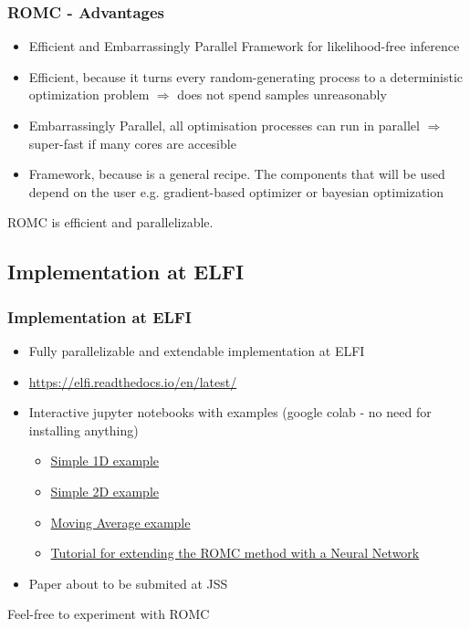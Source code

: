 \begin{frame}
  \frametitle{ROMC - Advantages}
  \begin{itemize}
  \item Efficient and Embarrassingly Parallel Framework for likelihood-free inference
  \item \alert{Efficient}, because it turns every random-generating
    process to a deterministic optimization problem \( \Rightarrow \)
    does not spend samples unreasonably
  \item \alert{Embarrassingly Parallel}, all optimisation processes
    can run in parallel \( \Rightarrow \) super-fast if many cores are accesible
  \item \alert{Framework}, because is a general recipe. The components
    that will be used depend on the user e.g. gradient-based optimizer
    or bayesian optimization
  \end{itemize}
  \noindent\makebox[\linewidth]{\rule{\paperwidth}{0.4pt}}
  ROMC is efficient and parallelizable.
\end{frame}

\subsection{Implementation at ELFI}
\begin{frame}
  \frametitle{Implementation at ELFI}
  \begin{itemize}
  \item Fully parallelizable and extendable implementation at ELFI
  \item \href{https://elfi.readthedocs.io/en/latest/}{https://elfi.readthedocs.io/en/latest/}
  \item Interactive jupyter notebooks with examples (google colab - no need for installing anything)
  \begin{itemize}
  \item \href{https://colab.research.google.com/drive/1lGRp0XrNfZ64NN0ASB_tYEKowXwlveDC}{Simple 1D example}
  \item \href{https://colab.research.google.com/drive/1Fof_WmCi1YizzSI_63aEsbLXsno5gSZ3}{Simple 2D example}
  \item \href{https://colab.research.google.com/drive/1nkdACQ370SSc0KB1bHv4sBRaxMlMqoNH}{Moving Average example}
  \item \href{https://colab.research.google.com/drive/1RzB-V1QueP1y1nyzv_VOqR1nVz3DUH3v}{Tutorial for extending the ROMC method with a Neural Network}
  \end{itemize}
  \item Paper about to be submited at JSS
  \end{itemize}
  \noindent\makebox[\linewidth]{\rule{\paperwidth}{0.4pt}}
  Feel-free to experiment with ROMC
\end{frame}


